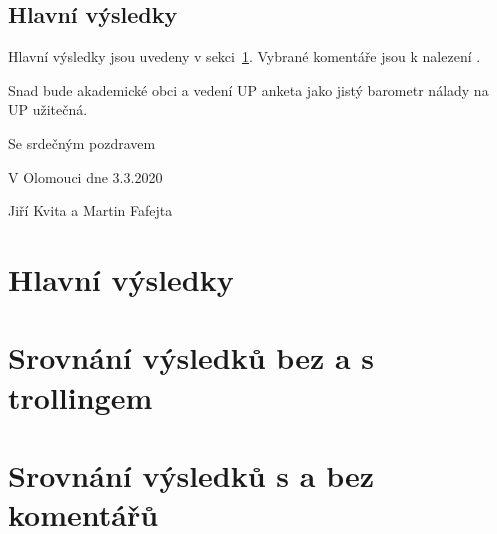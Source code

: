 \documentclass[a4paper,twoside]{article}
\begin{document}
\subsection{Hlavní výsledky}
Hlavní výsledky jsou uvedeny v sekci~\ref{sec:results}.
Vybrané komentáře jsou k nalezení .

\bigskip

\noindent Snad bude akademické obci a vedení UP anketa jako jistý barometr nálady na UP užitečná.

\bigskip

Se srdečným pozdravem

V Olomouci dne 3.3.2020

Jiří Kvita a Martin Fafejta




\newpage
\section{Hlavní výsledky}
\label{sec:results}



\appendix

\newpage
\section{Srovnání výsledků bez a s trollingem}
\label{sec:trolling}



\newpage
\section{Srovnání výsledků s a bez komentářů}
\label{sec:comments}

\end{document}
